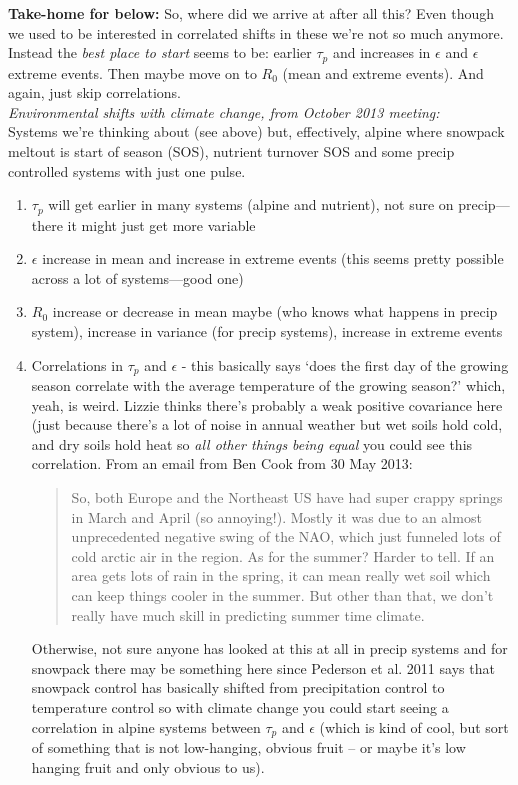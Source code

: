 \documentclass[11pt,a4paper,oneside]{article}
\begin{document}
{\bf Take-home for below:} So, where did we arrive at after all this? Even though we used to be interested in correlated shifts in these we're not so much anymore. Instead the \emph{best place to start} seems to be: earlier \(\tau_{p}\) and increases in \(\epsilon\) and \(\epsilon\) extreme events. Then maybe move on to \(R_{0}\) (mean and extreme events). And again, just skip correlations.\\

\noindent \emph{Environmental shifts with climate change, from October 2013 meeting:}\\
Systems we're thinking about (see above) but, effectively, alpine where snowpack meltout is start of season (SOS), nutrient turnover SOS and some precip controlled systems with just one pulse. 
\begin{enumerate}
\item \(\tau_{p}\) will get earlier in many systems (alpine and nutrient), not sure on precip---there it might just get more variable
\item \(\epsilon\) increase in mean and increase in extreme events (this seems pretty possible across a lot of systems---good one)
\item \(R_{0}\) increase or decrease in mean maybe (who knows what happens in precip system), increase in variance (for precip systems), increase in extreme events 
\item Correlations in \(\tau_{p}\) and \(\epsilon\) - this basically says `does the first day of the growing season correlate with the average temperature of the growing season?' which, yeah, is weird. Lizzie thinks there's probably a weak positive covariance here (just because there's a lot of noise in annual weather but wet soils hold cold, and dry soils hold heat so \emph{all other things being equal} you could see this correlation. From an email from Ben Cook from 30 May 2013:
\begin{quote}
So, both Europe and the Northeast US have had super crappy springs in March and April (so annoying!). Mostly it was due to an almost unprecedented negative swing of the NAO, which just funneled lots of cold arctic air in the region. As for the summer? Harder to tell. If an area gets lots of rain in the spring, it can mean really wet soil which can keep things cooler in the summer. But other than that, we don't really have much skill in predicting summer time climate. 
\end{quote}
Otherwise, not sure anyone has looked at this at all in precip systems and for snowpack there may be something here since Pederson et al. 2011 says that snowpack control has basically shifted from precipitation control to temperature control so with climate change you could start seeing a correlation in alpine systems between \(\tau_{p}\) and \(\epsilon\) (which is kind of cool, but sort of something that is not low-hanging, obvious fruit -- or maybe it's low hanging fruit and only obvious to us).

\end{enumerate}
\end{document}
